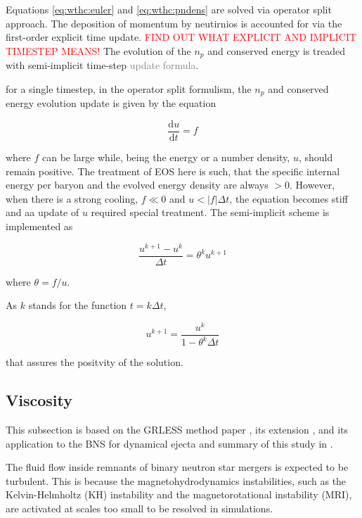 \documentclass[11pt,a4paper,headinclude=true,DIV=14,BCOR=8mm,chapterprefix,listof=totoc,twoside,openright,abstracton]{scrbook}
\newcommand{\red}[1]{\textcolor{red}{#1}}
\newcommand{\gray}[1]{\textcolor{gray}{#1}}
\newcommand{\dd}{\text{d}}
\begin{document}
Equations \eqref{eq:wthc:euler} and \eqref{eq:wthc:pndens} are solved via operator split approach.
The deposition of momentum by neutirnios is accounted for via the first-order explicit time update.
\red{FIND OUT WHAT EXPLICIT AND IMPLICIT TIMESTEP MEANS!}
The evolution of the $n_p$ and conserved energy is treaded with semi-implicit time-step \gray{update formula}.

for a single timestep, in the operator split formulism, the $n_p$ and conserved energy evolution update is given by the equation 

\begin{equation}
\frac{\dd u}{\dd t} = f
\end{equation}

where $f$ can be large while, being the energy or a number density, $u$, should remain positive.
The treatment of EOS here is such, that the specific internal energy per baryon and the evolved energy density are always $>0$. However, when there is a strong cooling, $f\ll0$ and $u<|f|\Delta t$, 
the equation becomes stiff and aa update of $u$ required special treatment. 
The semi-implicit scheme is implemented as 

\begin{equation}
\frac{u^{k+1}-u^{k}}{\Delta t} = \theta^k u^{k+1}
\end{equation}

where $\theta = f/u$.

As $k$ stands for the function $t=k\Delta t$,

\begin{equation}
u^{k+1} = \frac{u^{k}}{1-\theta^k \Delta t}
\end{equation}

that assures the positvity of the solution.


\subsection{Viscosity}


This subsection is based on the GRLESS method paper \cite{Radice:2017zta}, its extension  \cite{Radice:2020ids}, and its application to the BNS \cite{Radice:2017lry} for dynamical ejecta and summary of this study in \cite{Radice:2018pdn}.


The fluid flow inside remnants of binary neutron star mergers is expected to be turbulent. 
This is because the magnetohydrodynamics instabilities,
such as the Kelvin-Helmholtz (KH) instability and the magnetorotational instability (MRI), are  
activated at scales too small to be resolved in simulations.
\end{document}

